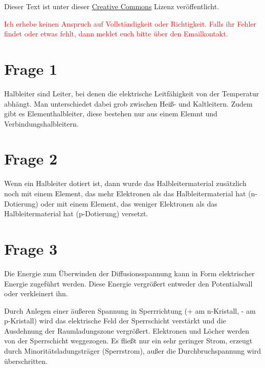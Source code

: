 




\maketitle

Dieser Text ist unter dieser \href{http://creativecommons.org/licenses/by-nc-sa/4.0/}{Creative Commons} Lizenz veröffentlicht.

\textcolor{red}{Ich erhebe keinen Anspruch auf Vollständigkeit oder Richtigkeit. Falls ihr Fehler findet oder etwas fehlt, dann meldet euch bitte über den Emailkontakt.}

\tableofcontents


\newpage

\section{Frage 1}

Halbleiter sind Leiter, bei denen die elektrische Leitfähigkeit von der Temperatur abhängt. Man unterschiedet dabei grob zwischen Heiß- und Kaltleitern. Zudem gibt es Elementhalbleiter, diese bestehen nur aus einem Elemnt und Verbindungshalbleitern.


\section{Frage 2}

Wenn ein Halbleiter dotiert ist, dann wurde das Halbleitermaterial zusätzlich noch mit einem Element, das mehr Elektronen als das Halbleitermaterial hat (n-Dotierung) oder mit einem Element, das weniger Elektronen als das Halbleitermaterial hat (p-Dotierung) versetzt.

\section{Frage 3}

Die Energie zum Überwinden der Diffusionsspannung kann in Form elektrischer Energie zugeführt werden. Diese Energie vergrößert entweder den Potentialwall oder verkleinert ihn.

Durch Anlegen einer äußeren Spannung in Sperrrichtung (+ am n-Kristall, - am p-Kristall) wird das elektrische Feld der Sperrschicht verstärkt und die Ausdehnung der Raumladungszone vergrößert. Elektronen und Löcher werden von der Sperrschicht weggezogen. Es fließt nur ein sehr geringer Strom, erzeugt durch Minoritätsladungsträger (Sperrstrom), außer die Durchbruchspannung wird überschritten.

